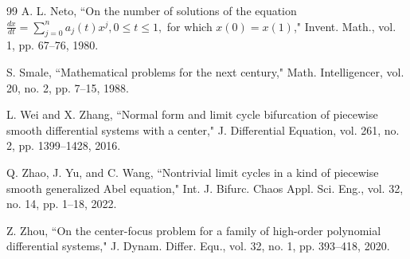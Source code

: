 \documentclass[11pt]{amsart}
\theoremstyle{remark}
\theoremstyle{definition}
\begin{document}
\begin{thebibliography}{99}
 A. L. Neto,   ``On the number of solutions of the equation $ \frac{dx}{dt}=\sum_{j=0}^{n}a_{j}(t)x^{j},0\leqslant t\leqslant1, $ for which $ x(0)=x(1) $,"  Invent. Math., vol. 1,   pp. 67--76,   1980.



  S. Smale,  ``Mathematical problems for the next century,"  Math. Intelligencer, vol.  20, no. 2,  pp. 7--15,  1988.



 L. Wei and  X. Zhang,    ``Normal form and limit cycle bifurcation of piecewise smooth differential systems with a center," J. Differential Equation, vol.  261, no. 2,  pp.  1399--1428,     2016.


  Q. Zhao,   J. Yu,  and C. Wang,   ``Nontrivial limit cycles in a kind of piecewise smooth generalized Abel equation," Int. J. Bifurc. Chaos  Appl. Sci. Eng., vol.   32,  no. 14,  pp. 1--18,  2022.





  Z. Zhou,      ``On the center-focus problem for a family of high-order polynomial differential systems," J. Dynam.
Differ. Equ., vol. 32,  no. 1,  pp.  393--418,   2020.











\end{thebibliography}
\end{document}
